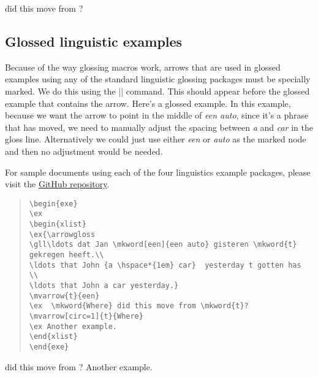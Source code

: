 \documentclass[11pt]{article}
\begin{document}
\begin{exe}
\arrowstrut
\ex  {} did 
this move from ?

\end{exe}

\subsection{Glossed linguistic examples}
Because of the way glossing macros work, arrows that are used in glossed examples using any of the standard linguistic glossing packages must be specially marked. We do this using the |\arrowgloss| command. This should appear before the glossed example that contains the arrow.  Here’s a glossed example. In this example, because we want the arrow to point in the middle of \emph{een auto}, since it’s a phrase that has moved, we need to manually adjust the spacing between \emph{a} and \emph{car} in the gloss line. Alternatively we could just use either \emph{een} or \emph{auto} as the marked node and then no adjustment would be needed. 

For sample documents using each of the four linguistics example packages, please visit the   \href{https://github.com/amunn/movement-arrows/}{GitHub repository}.

\begin{quote}
\begin{lstlisting}
\begin{exe}
\ex
\begin{xlist}
\ex{\arrowgloss
\gll\ldots dat Jan \mkword[een]{een auto} gisteren \mkword{t}  gekregen heeft.\\
\ldots that John {a \hspace*{1em} car}  yesterday t gotten has \\
\ldots that John a car yesterday.}
\mvarrow{t}{een}
\ex  \mkword{Where} did this move from \mkword{t}?
\mvarrow[circ=1]{t}{Where}
\ex Another example.
\end{xlist}
\end{exe}
\end{lstlisting}
\end{quote}

\begin{exe}
\ex
\begin{xlist}
\ex  {} did this move from ?
\ex Another example.
\end{xlist}
\end{exe}
\end{document}
